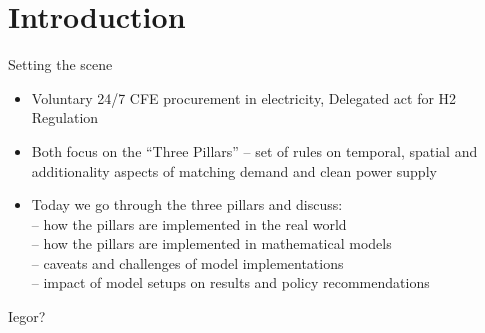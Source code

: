 \def\sectionpage{\begin{centering}
		\begin{beamercolorbox}[sep=12pt,center]{part title}
			\usebeamerfont{part title}\insertsectionhead\par
		\end{beamercolorbox}
	\end{centering}
}



\maketitle


\section{Introduction}

\begin{frame}{Setting the scene}
  
  \begin{itemize}
    \item Voluntary 24/7 CFE procurement in electricity, Delegated act for H2 Regulation
    \item Both focus on the \enquote{Three Pillars} -- set of rules on temporal, spatial and additionality aspects of matching demand and clean power supply
    \item Today we go through the \alert{three pillars} and discuss: \\
    -- how the pillars are implemented in the real world \\
    -- how the pillars are implemented in mathematical models \\
    -- caveats and challenges of model implementations \\
    -- impact of model setups on results and policy recommendations \\
  \end{itemize}

  Iegor?
  
\end{frame}

